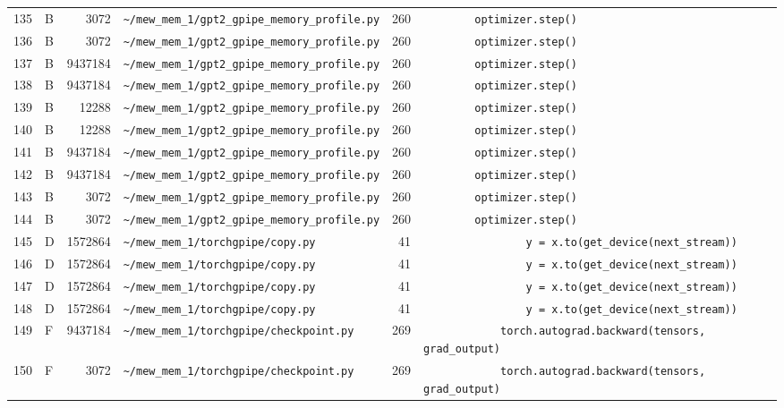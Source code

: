 \documentclass{article}
\begin{document}
\begin{longtable}{r l r p{6.5cm} r p{7.0cm}}
135 & B & 3072 & \lstinline|~/mew_mem_1/gpt2_gpipe_memory_profile.py| & 260 & \lstinline|        optimizer.step()| \\
136 & B & 3072 & \lstinline|~/mew_mem_1/gpt2_gpipe_memory_profile.py| & 260 & \lstinline|        optimizer.step()| \\
137 & B & 9437184 & \lstinline|~/mew_mem_1/gpt2_gpipe_memory_profile.py| & 260 & \lstinline|        optimizer.step()| \\
138 & B & 9437184 & \lstinline|~/mew_mem_1/gpt2_gpipe_memory_profile.py| & 260 & \lstinline|        optimizer.step()| \\
139 & B & 12288 & \lstinline|~/mew_mem_1/gpt2_gpipe_memory_profile.py| & 260 & \lstinline|        optimizer.step()| \\
140 & B & 12288 & \lstinline|~/mew_mem_1/gpt2_gpipe_memory_profile.py| & 260 & \lstinline|        optimizer.step()| \\
141 & B & 9437184 & \lstinline|~/mew_mem_1/gpt2_gpipe_memory_profile.py| & 260 & \lstinline|        optimizer.step()| \\
142 & B & 9437184 & \lstinline|~/mew_mem_1/gpt2_gpipe_memory_profile.py| & 260 & \lstinline|        optimizer.step()| \\
143 & B & 3072 & \lstinline|~/mew_mem_1/gpt2_gpipe_memory_profile.py| & 260 & \lstinline|        optimizer.step()| \\
144 & B & 3072 & \lstinline|~/mew_mem_1/gpt2_gpipe_memory_profile.py| & 260 & \lstinline|        optimizer.step()| \\
145 & D & 1572864 & \lstinline|~/mew_mem_1/torchgpipe/copy.py| & 41 & \lstinline|                y = x.to(get_device(next_stream))| \\
146 & D & 1572864 & \lstinline|~/mew_mem_1/torchgpipe/copy.py| & 41 & \lstinline|                y = x.to(get_device(next_stream))| \\
147 & D & 1572864 & \lstinline|~/mew_mem_1/torchgpipe/copy.py| & 41 & \lstinline|                y = x.to(get_device(next_stream))| \\
148 & D & 1572864 & \lstinline|~/mew_mem_1/torchgpipe/copy.py| & 41 & \lstinline|                y = x.to(get_device(next_stream))| \\
149 & F & 9437184 & \lstinline|~/mew_mem_1/torchgpipe/checkpoint.py| & 269 & \lstinline|            torch.autograd.backward(tensors, grad_output)| \\
150 & F & 3072 & \lstinline|~/mew_mem_1/torchgpipe/checkpoint.py| & 269 & \lstinline|            torch.autograd.backward(tensors, grad_output)| \\

\end{longtable}
\end{document}
